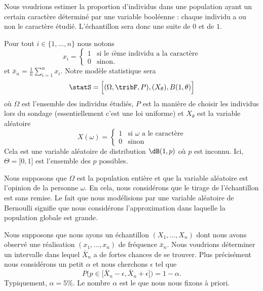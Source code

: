 Nous voudrions estimer la proportion d'individus dans une population ayant un certain caractère déterminé par une variable booléenne : chaque individu a ou non le caractère étudié. L'échantillon sera donc une suite de \( 0\) et de \( 1\).

Pour tout \( i\in\{ 1,\ldots, n \}\) nous notons
\begin{equation}
	x_i=\begin{cases}
		1 & \text{si le } i\text{ème individu a la caractère} \\
		0 & \text{sinon}.
	\end{cases}
\end{equation}
et \( \bar x_n=\frac{1}{ n }\sum_{i=1}^n x_i\). Notre modèle statistique sera
\begin{equation}
	\statS=\Big[ (\Omega,\tribF,P),(X_{\theta}),B(1,\theta) \Big]
\end{equation}
où \( \Omega\) est l'ensemble des individus étudiés, \( P\) est la manière de choisir les individus lors du sondage (essentiellement c'est une loi uniforme) et \( X_{\theta}\) est la variable aléatoire
\begin{equation}
	X(\omega)=\begin{cases}
		1 & \text{si } \omega\text{ a le caractère} \\
		0 & \text{sinon}
	\end{cases}
\end{equation}
Cela est une variable aléatoire de distribution \( \dB(1,p)\) où \( p\) est inconnu. Ici, \( \Theta=\mathopen[ 0 , 1 \mathclose]\) est l'ensemble des \( p\) possibles.

\begin{remark}
	Nous supposons que \( \Omega\) est la population entière et que la variable aléatoire est l'opinion de la personne \( \omega\). En cela, nous considérons que le tirage de l'échantillon est sans remise. Le fait que nous modélisions par une variable aléatoire de Bernoulli signifie que nous considérons l'approximation dans laquelle la population globale est grande.
\end{remark}

Nous supposons que nous ayons un échantillon \( (X_1,\ldots,X_n)\) dont nous avons observé une réalisation \( (x_1,\ldots,x_n)\) de fréquence \( \bar x_n\). Nous voudrions déterminer un intervalle dans lequel \( \bar X_n\) a de fortes chances de se trouver. Plus précisément nous considérons un petit \( \alpha\) et nous cherchons \( \epsilon\) tel que
\begin{equation}
	P\big( p\in\mathopen[ \bar X_n-\epsilon , \bar X_n+\epsilon \mathclose] \big)=1-\alpha.
\end{equation}
Typiquement, \( \alpha=5\%\). Le nombre \( \alpha\) est le  que nous nous fixons à priori.

